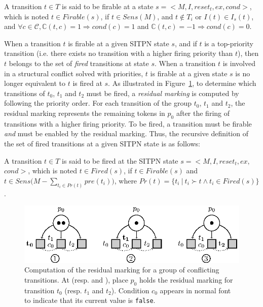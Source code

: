 \begin{definition}[Firability]
  \label{def:firable}
  A transition $t\in{}T$ is said to be firable at a state
  $s={<}M,I,reset_t,ex,cond{>}$, which is noted $t\in{}Firable(s)$, if
  $t\in{}Sens(M)$, and $t\notin{}T_i$ or $I(t)\in{}I_s(t)$, and
  $\forall c \in \mathcal{C}, \mathbb{C}(t, c) = 1 \Rightarrow cond(c)
  = 1$ and $\mathbb{C}(t, c) = -1 \Rightarrow cond(c) = 0$.
\end{definition}

When a transition $t$ is firable at a given SITPN state $s$, and if
$t$ is a top-priority transition (i.e. there exists no transition with
a higher firing priority than $t$), then $t$ belongs to the set of
\textit{fired} transitions at state $s$.  When a transition $t$ is
involved in a structural conflict solved with priorities, $t$ is
firable at a given state $s$ is no longer equivalent to $t$ is fired
at $s$.  As illustrated in Figure~\ref{fig:resid-marking}, to
determine which transitions of $t_0$, $t_1$ and $t_2$ must be fired, a
\emph{residual marking} is computed by following the priority
order. For each transition of the group $t_0$, $t_1$ and $t_2$, the
residual marking represents the remaining tokens in $p_0$ after the
firing of transitions with a higher firing priority. To be fired, a
transition must be firable \emph{and} must be enabled by the residual
marking. Thus, the recursive definition of the set of fired
transitions at a given SITPN state is as follows:

\begin{definition}[Fired]
  \label{def:fired}
  A transition $t\in{}T$ is said to be fired at the SITPN state
  $s={<}M,I,reset_t,ex,$ $cond{>}$, which is noted $t\in{}Fired(s)$,
  if $t\in{}Firable(s)$ and
  $t\in{}Sens\big(M-\sum\limits_{t_i\in{}Pr(t)}pre(t_i)\big)$, where
  $Pr(t)=\{t_i~|~t_i\succ{}t\wedge{}t_i\in{}Fired(s)\}$.
\end{definition}


\begin{figure}[H]
  \centering
  \includegraphics[keepaspectratio=true, width=.9\textwidth]{resid-marking.eps}
  \caption[Computation of the residual marking of a group of
  conflicting transitions.]{Computation of the residual marking for a
    group of conflicting transitions. At 
    (resp.  and ), place $p_0$ holds the
    residual marking for transition $t_0$ (resp. $t_1$ and
    $t_2$). Condition $c_0$ appears in normal font to indicate that
    its current value is \texttt{false}.}
  \label{fig:resid-marking}
\end{figure}

